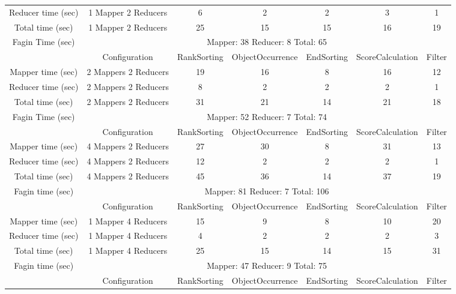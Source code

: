 \documentclass[a4paper]{article}
\begin{document}
\begin{table}[htbp]
{\begin{tabular}{|c|c|c|c|c|c|c|}
            Reducer time (sec) & 1 Mapper 2 Reducers & 6 & 2 & 2 & 3 & 1   \\
            Total time (sec) & 1 Mapper 2 Reducers & 25 & 15 & 15 & 16 & 19 \\
            \hline
            Fagin Time (sec) & \multicolumn{6}{|c|}{Mapper: 38 Reducer: 8 Total: 65}  \\
            \hline
            \hline
             & Configuration & RankSorting & ObjectOccurrence & EndSorting & ScoreCalculation & Filter  \\
            \hline
            Mapper time (sec) & 2 Mappers 2 Reducers & 19 & 16 & 8 & 16 & 12  \\
            Reducer time (sec) & 2 Mappers 2 Reducers & 8 & 2 & 2 & 2 & 1   \\
            Total time (sec) & 2 Mappers 2 Reducers & 31 & 21 & 14 & 21 & 18 \\
            \hline
            Fagin Time (sec) & \multicolumn{6}{|c|}{Mapper: 52 Reducer: 7 Total: 74}  \\
            \hline
            \hline
             & Configuration & RankSorting & ObjectOccurrence & EndSorting & ScoreCalculation & Filter  \\
            \hline
            Mapper time (sec) & 4 Mappers 2 Reducers & 27 & 30 & 8 & 31 & 13  \\
            Reducer time (sec) & 4 Mappers 2 Reducers & 12 & 2 & 2 & 2 & 1   \\
            Total time (sec) & 4 Mappers 2 Reducers & 45 & 36 & 14 & 37 & 19 \\
            \hline
            Fagin time (sec) & \multicolumn{6}{|c|}{Mapper: 81    Reducer: 7  Total: 106}  \\
            \hline
            \hline
             & Configuration & RankSorting & ObjectOccurrence & EndSorting & ScoreCalculation & Filter  \\
            \hline
            Mapper time (sec) & 1 Mapper 4 Reducers & 15 & 9 & 8 & 10 & 20  \\
            Reducer time (sec) & 1 Mapper 4 Reducers & 4 & 2 & 2 & 2 & 3  \\
            Total time (sec) & 1 Mapper 4 Reducers & 25 & 15 & 14 & 15 & 31 \\
            \hline
            Fagin time (sec) & \multicolumn{6}{|c|}{Mapper: 47 Reducer: 9 Total: 75}  \\
            \hline
            \hline
             & Configuration & RankSorting & ObjectOccurrence & EndSorting & ScoreCalculation & Filter  \\

\end{tabular}}
\end{table}
\end{document}
